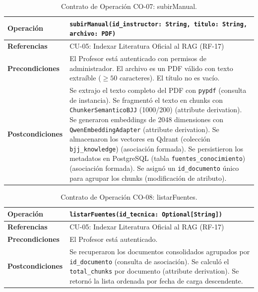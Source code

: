 \documentclass[12pt,letterpaper]{article}
\begin{document}
\begin{table}[H]
\centering
\small
\begin{tabularx}{\textwidth}{|l|X|}
\hline
\textbf{Operación} & \texttt{subirManual(id\_instructor: String, titulo: String, archivo: PDF)} \\
\hline
\textbf{Referencias} & CU-05: Indexar Literatura Oficial al RAG (RF-17) \\
\hline
\textbf{Precondiciones} & El Profesor está autenticado con permisos de administrador. \newline
El archivo es un PDF válido con texto extraíble ($\geq 50$ caracteres). \newline
El título no es vacío. \\
\hline
\textbf{Postcondiciones} & Se extrajo el texto completo del PDF con \texttt{pypdf} (consulta de instancia). \newline
Se fragmentó el texto en chunks con \texttt{ChunkerSemanticoBJJ} (1000/200) (attribute derivation). \newline
Se generaron embeddings de 2048 dimensiones con \texttt{QwenEmbeddingAdapter} (attribute derivation). \newline
Se almacenaron los vectores en Qdrant (colección \texttt{bjj\_knowledge}) (asociación formada). \newline
Se persistieron los metadatos en PostgreSQL (tabla \texttt{fuentes\_conocimiento}) (asociación formada). \newline
Se asignó un \texttt{id\_documento} único para agrupar los chunks (modificación de atributo). \\
\hline
\end{tabularx}
\caption{Contrato de Operación CO-07: subirManual.}
\label{tab:co-07}
\end{table}

\begin{table}[H]
\centering
\small
\begin{tabularx}{\textwidth}{|l|X|}
\hline
\textbf{Operación} & \texttt{listarFuentes(id\_tecnica: Optional[String])} \\
\hline
\textbf{Referencias} & CU-05: Indexar Literatura Oficial al RAG (RF-17) \\
\hline
\textbf{Precondiciones} & El Profesor está autenticado. \\
\hline
\textbf{Postcondiciones} & Se recuperaron los documentos consolidados agrupados por \texttt{id\_documento} (consulta de asociación). \newline
Se calculó el \texttt{total\_chunks} por documento (attribute derivation). \newline
Se retornó la lista ordenada por fecha de carga descendente. \\
\hline
\end{tabularx}
\caption{Contrato de Operación CO-08: listarFuentes.}
\label{tab:co-08}
\end{table}
\end{document}

